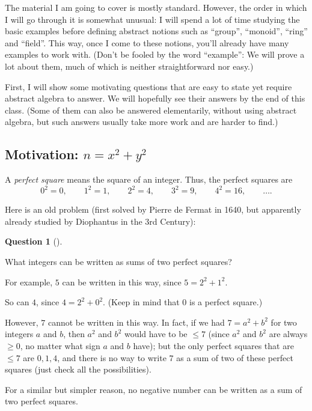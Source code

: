\documentclass[numbers=enddot,12pt,final,onecolumn,notitlepage]{scrartcl}%
\numberwithin{exer}{subsection}
\theoremstyle{definition}
\newtheorem{quest}[theo]{Question}
\newenvironment{question}[1][]
{\begin{quest}[#1]\begin{leftbar}}
{\end{leftbar}\end{quest}}
\newenvironment{question}[1][Question]{\noindent\textbf{#1.} }{\ \rule{0.5em}{0.5em}}
\begin{document}
The material I am going to cover is mostly standard. However, the order in
which I will go through it is somewhat unusual: I will spend a lot of time
studying the basic examples before defining abstract notions such as
``group'', ``monoid'', ``ring'' and ``field''. This way, once I come to these
notions, you'll already have many examples to work with. (Don't be fooled by
the word ``example'': We will prove a lot about them, much of which is neither
straightforward nor easy.)

First, I will show some motivating questions that are easy to state yet
require abstract algebra to answer. We will hopefully see their answers by the
end of this class. (Some of them can also be answered elementarily, without
using abstract algebra, but such answers usually take more work and are harder
to find.)

\subsection{\label{sect.intro.sum-of-2sq}Motivation: $n=x^{2}+y^{2}$}

A \textit{perfect square} means the square of an integer. Thus, the perfect
squares are
\[
0^{2} = 0, \qquad1^{2} = 1, \qquad2^{2} = 4, \qquad3^{2} = 9, \qquad4^{2} =
16, \qquad\ldots.
\]


Here is an old problem (first solved by Pierre de Fermat in 1640, but
apparently already studied by Diophantus in the 3rd Century):

\begin{question}
\label{quest.intro.sum-of-2sq.1} What integers can be written as sums of two
perfect squares?
\end{question}

For example, $5$ can be written in this way, since $5=2^{2}+1^{2}$.

So can $4$, since $4=2^{2}+0^{2}$. (Keep in mind that $0$ is a perfect square.)

However, $7$ cannot be written in this way. In fact, if we had $7 = a^{2} +
b^{2}$ for two integers $a$ and $b$, then $a^{2}$ and $b^{2}$ would have to be
$\leq7$ (since $a^{2}$ and $b^{2}$ are always $\geq0$, no matter what sign $a$
and $b$ have); but the only perfect squares that are $\leq7$ are $0,1,4$, and
there is no way to write $7$ as a sum of two of these perfect squares (just
check all the possibilities).

For a similar but simpler reason, no negative number can be written as a sum
of two perfect squares.
\end{document}
